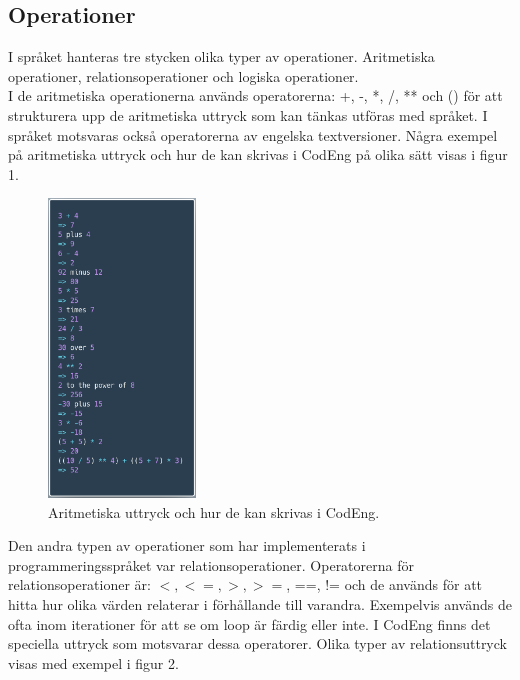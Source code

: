 \documentclass{article}
\begin{document}
\subsection{Operationer}
I språket hanteras tre stycken olika typer av operationer. Aritmetiska operationer, relationsoperationer och logiska operationer. \\ \newline
I de aritmetiska operationerna används operatorerna: +, -, *, /, ** och () för att strukturera upp de aritmetiska uttryck som kan tänkas utföras med språket. I språket motsvaras också operatorerna av engelska textversioner. Några exempel på aritmetiska uttryck och hur de kan skrivas i CodEng på olika sätt visas i figur 1.

\FloatBarrier
\begin{figure}[h!]
    \centering
    \includegraphics[width=0.35\textwidth]{arithm.png}
    \caption{Aritmetiska uttryck och hur de kan skrivas i CodEng.}
    \label{fig:arithm1}
\end{figure}
\FloatBarrier

Den andra typen av operationer som har implementerats i programmeringsspråket var relationsoperationer. Operatorerna för relationsoperationer är: \(<, <=, >, >=\), ==, != och de används för att hitta hur olika värden relaterar i förhållande till varandra. Exempelvis används de ofta inom iterationer för att se om loop är färdig eller inte. I CodEng finns det speciella uttryck som motsvarar dessa operatorer. Olika typer av relationsuttryck visas med exempel i figur 2.
\end{document}
